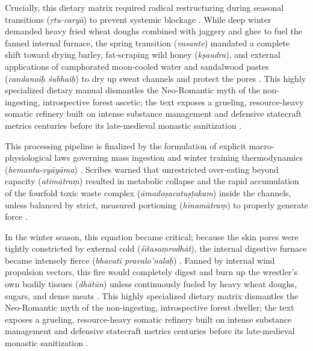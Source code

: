 \documentclass[11pt,twoside,letterpaper]{article}
\begin{document}
Crucially, this dietary matrix required radical restructuring during seasonal transitions (\textit{ṛtu-caryā}) to prevent systemic blockage \citep{MP_7}. While deep winter demanded heavy fried wheat doughs combined with jaggery and ghee to fuel the fanned internal furnace, the spring transition (\textit{vasante}) mandated a complete shift toward drying barley, fat-scraping wild honey (\textit{kṣaudra}), and external applications of camphorated moon-cooled water and sandalwood pastes (\textit{candanaiḥ śubhaiḥ}) to dry up sweat channels and protect the pores \citep{MP_7}. This highly specialized dietary manual dismantles the Neo-Romantic myth of the non-ingesting, introspective forest ascetic; the text exposes a grueling, resource-heavy somatic refinery built on intense substance management and defensive statecraft metrics centuries before its late-medieval monastic sanitization \citep{MP_7, Wujastyk2025}.

This processing pipeline is finalized by the formulation of explicit macro-physiological laws governing mass ingestion and winter training thermodynamics (\textit{hemanta-vyāyāma}) \citep{MP_7}. Scribes warned that unrestricted over-eating beyond capacity (\textit{atimātraṃ}) resulted in metabolic collapse and the rapid accumulation of the fourfold toxic waste complex (\textit{āmadoṣacatuṣṭakam}) inside the channels, unless balanced by strict, measured portioning (\textit{hīnamātraṃ}) to properly generate force \citep{MP_7}. 

In the winter season, this equation became critical; because the skin pores were tightly constricted by external cold (\textit{śītasaṃrodhāt}), the internal digestive furnace became intensely fierce (\textit{bhavati pravalo’nalaḥ}) \citep{MP_7}. Fanned by internal wind propulsion vectors, this fire would completely digest and burn up the wrestler's own bodily tissues (\textit{dhātūn}) unless continuously fueled by heavy wheat doughs, sugars, and dense meats \citep{MP_7}. This highly specialized dietary matrix dismantles the Neo-Romantic myth of the non-ingesting, introspective forest dweller; the text exposes a grueling, resource-heavy somatic refinery built on intense substance management and defensive statecraft metrics centuries before its late-medieval monastic sanitization \citep{MP_7, Wujastyk2025}.
\end{document}
